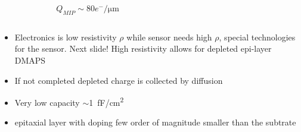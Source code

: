 \begin{frame}
\begin{columns}
\begin{equation*}
                \end{equation*}  
                \begin{equation*}
                    \hspace{80pt} Q_{MIP} \sim 80 e^-/\si{\um}
                \end{equation*}  
            \end{columns}   
        \medskip 
        \begin{itemize}
            \item Electronics is low resistivity $\rho$ while sensor needs high $\rho$, special technologies for the sensor. Next slide!  High resistivity allows for depleted epi-layer DMAPS
            \item If not completed depleted charge is collected by diffusion
            \item Very low capacity $\sim$\SI{1}{fF/cm\squared}
            \item epitaxial layer with doping few order of magnitude smaller than the subtrate
        \end{itemize}
    \end{frame} 



